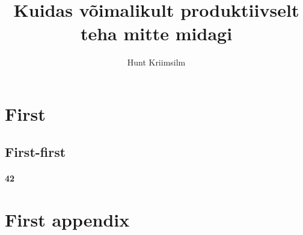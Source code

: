 \documentclass{report}
\title{Kuidas võimalikult produktiivselt \\ teha mitte midagi}
\author{Hunt Kriimsilm}
\begin{document}
\maketitle
\tableofcontents


\chapter{First}

\section{First-first}
\autocite{wiki}

\subsubsection{42}

\printbibliography

\appendix
\chapter{First appendix}
\cite{wiki}
\end{document}
